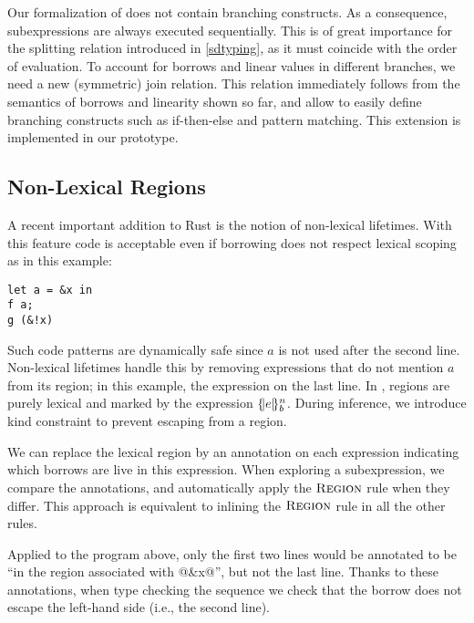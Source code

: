 Our formalization of \lang does not contain branching constructs. As a consequence,
subexpressions are always executed sequentially. This is of great importance
for the splitting relation introduced in \cref{sdtyping}, as it must
coincide with the order of evaluation. To account for borrows and linear
values in different branches, we need a new (symmetric) join relation.
This relation immediately follows from the semantics of borrows and linearity
shown so far, and allow to easily define branching constructs such as if-then-else
and pattern matching.
This extension is implemented in our prototype.

\subsection{Non-Lexical Regions}

A recent important addition to Rust is the notion of non-lexical lifetimes.
With this feature code is acceptable even if borrowing does not respect
lexical scoping as in this example:

\begin{lstlisting}
let a = &x in
f a;
g (&!x)
\end{lstlisting}

Such code patterns are dynamically safe since $a$ is not used after
the second line.
Non-lexical lifetimes handle this by removing expressions
that do not mention $a$ from its region; in this example,  the
expression on the last line.
%
In \lang, regions are purely lexical and marked by the
expression $\region{b}{e}$.
During inference, we introduce kind constraint to prevent escaping from
a region.

We can replace the lexical region by
an annotation on each expression indicating which borrows are live
in this expression.
When exploring a subexpression, we compare the annotations, and automatically
apply the $\textsc{Region}$ rule when they differ.
%
This approach is equivalent to inlining the $\textsc{Region}$ rule in all the other
rules.

Applied to the program above, only the first two lines would be annotated
to be ``in the region associated with @&x@'', but not the last line.
Thanks to these annotations, when type checking the sequence we check
that the borrow does not escape the left-hand side (i.e., the second line).

\lstDeleteShortInline@

